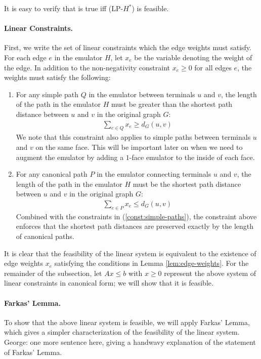 \documentclass[11pt]{article}
\newcommand{\george}[1]{{\color{green} George: #1}}
\begin{document}
It is easy to verify that  is true iff (LP-$H^*$) is feasible.

\iffalse
\paragraph{Linear Constraints.} First, we write the set of linear constraints which the edge weights must satisfy. For each edge $e$ in the emulator $H$, let $x_e$ be the variable denoting the weight of the edge. In addition to the non-negativity constraint $x_e\ge 0$ for all edges $e$, the weights must satisfy the following:

\begin{enumerate}
    \item For any simple path $Q$ in the emulator between terminals $u$ and $v$, the length of the path in the emulator $H$ must be greater than the shortest path distance between $u$ and $v$ in the original graph $G$:
    \begin{align}
        \sum_{e\in Q}x_e\ge d_G(u,v)\label{const:simple-paths}
    \end{align}
    We note that this constraint also applies to simple paths between terminals $u$ and $v$ on the same face. This will be important later on when we need to augment the emulator by adding a $1$-face emulator to the inside of each face.
    \item For any canonical path $P$ in the emulator connecting terminals $u$ and $v$, the length of the path in the emulator $H$ must be the shortest path distance between $u$ and $v$ in the original graph $G$:
    \begin{align}
        \sum_{e\in P}x_e\le d_G(u,v)\label{const:canonical-paths}
    \end{align}
    Combined with the constraints in (\ref{const:simple-paths}), the constraint above enforces that the shortest path distances are preserved exactly by the length of canonical paths.
\end{enumerate}
It is clear that the feasibility of the linear system is equivalent to the existence of edge weights $x_e$ satisfying the conditions in Lemma \ref{lem:edge-weights}. For the remainder of the subsection, let $Ax\le b$ with $x\ge 0$ represent the above system of linear constraints in canonical form; we will show that it is feasible.

\paragraph{Farkas' Lemma.}
To show that the above linear system is feasible, we will apply Farkas' Lemma, which gives a simpler characterization of the feasibility of the linear system. \george{one more sentence here, giving a handwavy explanation of the statement of Farkas' Lemma.}
\end{document}
